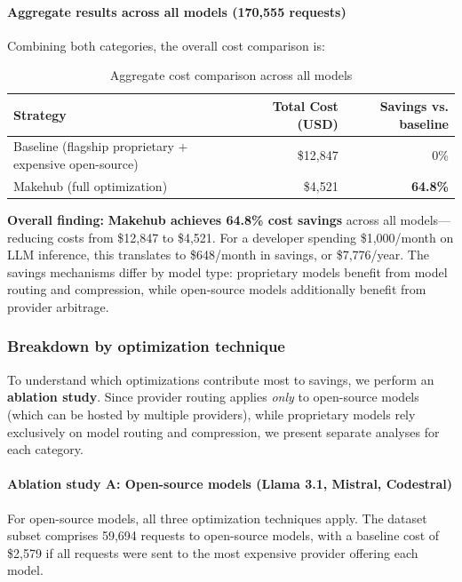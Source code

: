\documentclass[english]{article}
\begin{document}
\paragraph{Aggregate results across all models (170,555 requests)}

Combining both categories, the overall cost comparison is:

\begin{table}[H]
\centering
\caption{Aggregate cost comparison across all models}
\label{tab:cost_comparison_aggregate}
\begin{tabular}{|l|r|r|}
\hline
\textbf{Strategy} & \textbf{Total Cost (USD)} & \textbf{Savings vs. baseline} \\
\hline
Baseline (flagship proprietary + expensive open-source) & \$12,847 & 0\% \\
\hline
Makehub (full optimization) & \$4,521 & \textbf{64.8\%} \\
\hline
\end{tabular}
\end{table}

\medskip

\noindent\textbf{Overall finding:} \textbf{Makehub achieves 64.8\% cost savings} across all models—reducing costs from \$12,847 to \$4,521. For a developer spending \$1,000/month on LLM inference, this translates to \$648/month in savings, or \$7,776/year. The savings mechanisms differ by model type: proprietary models benefit from model routing and compression, while open-source models additionally benefit from provider arbitrage.

\subsubsection{Breakdown by optimization technique}

To understand which optimizations contribute most to savings, we perform an \textbf{ablation study}. Since provider routing applies \emph{only} to open-source models (which can be hosted by multiple providers), while proprietary models rely exclusively on model routing and compression, we present separate analyses for each category.

\paragraph{Ablation study A: Open-source models (Llama 3.1, Mistral, Codestral)}

For open-source models, all three optimization techniques apply. The dataset subset comprises 59,694 requests to open-source models, with a baseline cost of \$2,579 if all requests were sent to the most expensive provider offering each model.
\end{document}
